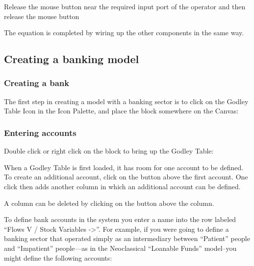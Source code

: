 
Release the mouse button near the required input port of the operator
and then release the mouse button



The equation is completed by wiring up the other components in the same way.



\subsection{Creating a banking model}
\label{creatingBankingModel}

\subsubsection{Creating a bank}

The first step in creating a model with a banking sector is to click on the Godley Table Icon in the Icon Palette, and place the block somewhere on the Canvas:


\subsubsection{Entering accounts}

Double click or right click on the  block
to bring up the Godley Table:



When a Godley Table is first loaded, it has room for one account to be defined. To create an additional account, click on the  button above the first account. One click then adds another column in which an additional account can be defined.



A column can be deleted by clicking on the  button above the column.

To define bank accounts in the system you enter a name into the row
labeled ``Flows V / Stock Variables ->''. For example, if you were
going to define a banking sector that operated simply as an
intermediary between ``Patient'' people and ``Impatient'' people---as
in the Neoclassical ``Loanable Funds'' model--you might define the
following accounts: 

